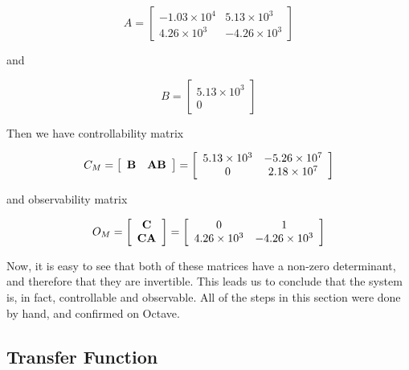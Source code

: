 \documentclass[a4paper, 12pt]{article}
\begin{document}
\begin{equation}
  A = \left[
  \begin{array}{cc}
    -1.03 \times 10^4 & 5.13 \times 10^3 \\
    4.26 \times 10^3 & -4.26 \times 10^3
  \end{array}
  \right]
  \label{eq:q_A}
\end{equation}

\noindent and

\begin{equation}
  B = \left[
  \begin{array}{c}
    5.13 \times 10^3 \\
    0
  \end{array}
  \right]
  \label{eq:q_B}
\end{equation}

Then we have controllability matrix

\begin{equation}
  C_M = \left[
  \begin{array}{c c}
    \textbf{B} & \textbf{AB}
  \end{array}
  \right]
  = \left[
  \begin{array}{c c}
    5.13 \times 10^3 & -5.26 \times 10^7 \\
    0 & 2.18 \times 10^7
  \end{array}
  \right]
  \label{eq:q_cm}
\end{equation}

and observability matrix

\begin{equation}
  O_M = \left[
  \begin{array}{c c}
    \textbf{C} \\
    \textbf{CA}
  \end{array}
\right] =
  \left[
  \begin{array}{c c}
    0 & 1 \\
    4.26 \times 10^3 & -4.26 \times 10^3
  \end{array}
  \right]
  \label{eq:q_om}
\end{equation}

Now, it is easy to see that both of these matrices have a non-zero determinant,
and therefore that they are invertible. This leads us to conclude that the
system is, in fact, controllable and observable. All of the steps in this
section were done by hand, and confirmed on Octave.

\subsection{Transfer Function}
\end{document}
